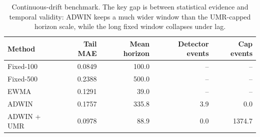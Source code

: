 \begin{table}[!htbp]
\centering
\caption{Continuous-drift benchmark. The key gap is between statistical evidence and temporal validity: ADWIN keeps a much wider window than the UMR-capped horizon scale, while the long fixed window collapses under lag.}
\label{tab:continuous_benchmark}
\begin{tabular}{lrrrr}
\toprule
Method & Tail MAE & Mean horizon & Detector events & Cap events \\
\midrule
Fixed-100 & 0.0849 & 100.0 & -- & -- \\
Fixed-500 & 0.2388 & 500.0 & -- & -- \\
EWMA & 0.1291 & 39.0 & -- & -- \\
ADWIN & 0.1757 & 335.8 & 3.9 & 0.0 \\
ADWIN + UMR & 0.0978 & 88.9 & 0.0 & 1374.7 \\
\bottomrule
\end{tabular}
\end{table}

